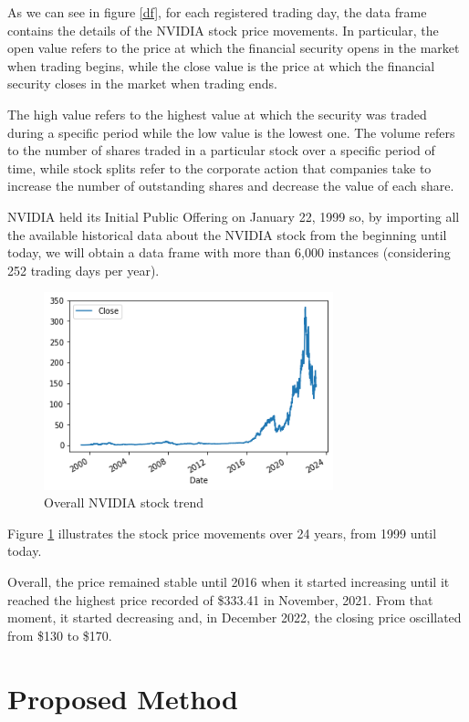 \documentclass[conference,compsoc]{IEEEtran}
\begin{document}
As we can see in figure \ref{df}, for each registered trading day, the data frame contains the details of the NVIDIA stock price movements.
%
In particular, the open value refers to the price at which the financial security opens in the market when trading begins, while the close value is the price at which the financial security closes in the market when trading ends.

The high value refers to the highest value at which the security was traded during a specific period while the low value is the lowest one.
%
The volume refers to the number of shares traded in a particular stock over a specific period of time, while stock splits refer to the corporate action that companies take to increase the number of outstanding shares and decrease the value of each share.

NVIDIA held its Initial Public Offering on January 22, 1999 so, by importing all the available historical data about the NVIDIA stock from the beginning until today, we will obtain a data frame with more than 6,000 instances (considering 252 trading days per year).

\begin{figure}[h]
\centering
\includegraphics[width=3.3in]{images/trend.png}
\caption{Overall NVIDIA stock trend}
\label{trend}
\end{figure}

Figure \ref{trend} illustrates the stock price movements over 24 years, from 1999 until today.

Overall, the price remained stable until 2016 when it started increasing until it reached the highest price recorded of \$333.41 in November, 2021.
%
From that moment, it started decreasing and, in December 2022, the closing price oscillated from \$130 to \$170.

\section{Proposed Method}
\end{document}

